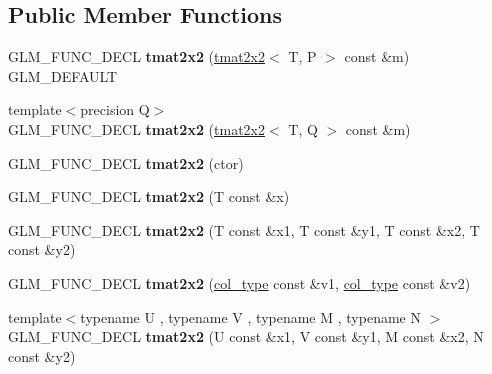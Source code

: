 \subsection*{Public Member Functions}
\begin{DoxyCompactItemize}
\item 
\hypertarget{structglm_1_1tmat2x2_a2d90ad0e8ab29491c83dcc024948b64e}{G\-L\-M\-\_\-\-F\-U\-N\-C\-\_\-\-D\-E\-C\-L {\bfseries tmat2x2} (\hyperlink{structglm_1_1tmat2x2}{tmat2x2}$<$ T, P $>$ const \&m) G\-L\-M\-\_\-\-D\-E\-F\-A\-U\-L\-T}\label{structglm_1_1tmat2x2_a2d90ad0e8ab29491c83dcc024948b64e}

\item 
\hypertarget{structglm_1_1tmat2x2_a2f3cdab306325bbc4b1e1c57eb3a203a}{{\footnotesize template$<$precision Q$>$ }\\G\-L\-M\-\_\-\-F\-U\-N\-C\-\_\-\-D\-E\-C\-L {\bfseries tmat2x2} (\hyperlink{structglm_1_1tmat2x2}{tmat2x2}$<$ T, Q $>$ const \&m)}\label{structglm_1_1tmat2x2_a2f3cdab306325bbc4b1e1c57eb3a203a}

\item 
\hypertarget{structglm_1_1tmat2x2_a871a3d4b82824eee2c2c9cbfc09942a4}{G\-L\-M\-\_\-\-F\-U\-N\-C\-\_\-\-D\-E\-C\-L {\bfseries tmat2x2} (ctor)}\label{structglm_1_1tmat2x2_a871a3d4b82824eee2c2c9cbfc09942a4}

\item 
\hypertarget{structglm_1_1tmat2x2_a8ecfca5a06c298b291cf5ee345136ca4}{G\-L\-M\-\_\-\-F\-U\-N\-C\-\_\-\-D\-E\-C\-L {\bfseries tmat2x2} (T const \&x)}\label{structglm_1_1tmat2x2_a8ecfca5a06c298b291cf5ee345136ca4}

\item 
\hypertarget{structglm_1_1tmat2x2_a6caec6c0611ff61d5bb29585c7d7e094}{G\-L\-M\-\_\-\-F\-U\-N\-C\-\_\-\-D\-E\-C\-L {\bfseries tmat2x2} (T const \&x1, T const \&y1, T const \&x2, T const \&y2)}\label{structglm_1_1tmat2x2_a6caec6c0611ff61d5bb29585c7d7e094}

\item 
\hypertarget{structglm_1_1tmat2x2_aa5d894325319f29df594df7cf9b66da7}{G\-L\-M\-\_\-\-F\-U\-N\-C\-\_\-\-D\-E\-C\-L {\bfseries tmat2x2} (\hyperlink{structglm_1_1tvec2}{col\-\_\-type} const \&v1, \hyperlink{structglm_1_1tvec2}{col\-\_\-type} const \&v2)}\label{structglm_1_1tmat2x2_aa5d894325319f29df594df7cf9b66da7}

\item 
\hypertarget{structglm_1_1tmat2x2_aac710faffcebf55cc2120a98b4ab0373}{{\footnotesize template$<$typename U , typename V , typename M , typename N $>$ }\\G\-L\-M\-\_\-\-F\-U\-N\-C\-\_\-\-D\-E\-C\-L {\bfseries tmat2x2} (U const \&x1, V const \&y1, M const \&x2, N const \&y2)}\label{structglm_1_1tmat2x2_aac710faffcebf55cc2120a98b4ab0373}


\end{DoxyCompactItemize}
